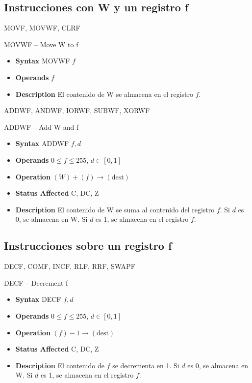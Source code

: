 \documentclass[xcolor=dvipsnames,handout]{beamer}
\begin{document}
\subsection[W y f]{Instrucciones con W y un registro f} %
\begin{frame}{MOVF, MOVWF, CLRF}
  \begin{block}{MOVWF -- Move W to f}
      \begin{itemize}
	\item\textbf{Syntax} MOVWF $f$
	\item\textbf{Operands} $f$
	\item\textbf{Description} El contenido de W se almacena en el registro $f$.
      \end{itemize}      

  \end{block}
\end{frame}

\begin{frame}{ADDWF, ANDWF, IORWF, SUBWF, XORWF}
   \begin{block}{ADDWF -- Add W and f}
      \begin{itemize}
	\item\textbf{Syntax} ADDWF $f, d$
	\item\textbf{Operands} $0\leq f\leq 255$, $d\in [0,1]$
	\item\textbf{Operation} $(W)+(f)\rightarrow (\textrm{dest})$
	\item\textbf{Status Affected} C, DC, Z
	\item\textbf{Description} El contenido de W se suma al contenido del registro $f$. Si $d$ es 0, se almacena en W. Si $d$ es 1, se almacena en el registro $f$.
      \end{itemize}      
  \end{block}

\end{frame}


\subsection[Sobre registros]{Instrucciones sobre un registro f} %

\begin{frame}{DECF, COMF, INCF, RLF, RRF, SWAPF}
   \begin{block}{DECF -- Decrement f}
      \begin{itemize}
	\item\textbf{Syntax} DECF $f, d$
	\item\textbf{Operands} $0\leq f\leq 255$, $d\in [0,1]$
	\item\textbf{Operation} $(f)-1\rightarrow (\textrm{dest})$
	\item\textbf{Status Affected} C, DC, Z
	\item\textbf{Description} El contenido de $f$ se decrementa en 1. Si $d$ es 0, se almacena en W. Si $d$ es 1, se almacena en el registro $f$.
      \end{itemize}      
  \end{block}

\end{frame}
\end{document}

